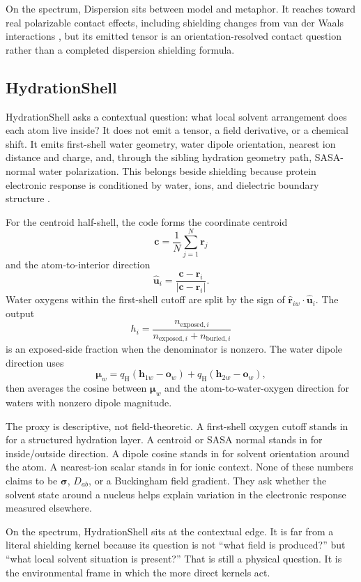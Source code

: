 \documentclass[11pt]{article}
\begin{document}
On the spectrum, Dispersion sits between model and metaphor. It reaches toward
real polarizable contact effects, including shielding changes from
van der Waals interactions \cite{kromhout1969}, but its emitted tensor is an
orientation-resolved contact question rather than a completed dispersion
shielding formula.

\subsection{HydrationShell}

HydrationShell asks a contextual question: what local solvent arrangement does
each atom live inside? It does not emit a tensor, a field derivative, or a
chemical shift. It emits first-shell water geometry, water dipole orientation,
nearest ion distance and charge, and, through the sibling hydration geometry
path, SASA-normal water polarization. This belongs beside shielding because
protein electronic response is conditioned by water, ions, and dielectric
boundary structure \cite{nakasako2004,halle2004,martin2015}.

For the centroid half-shell, the code forms the coordinate centroid
\[
  \bm c=\frac1N\sum_{j=1}^N\bm r_j
\]
and the atom-to-interior direction
\[
  \hat{\bm u}_i=\frac{\bm c-\bm r_i}{|\bm c-\bm r_i|}.
\]
Water oxygens within the first-shell cutoff are split by the sign of
\(\hat{\bm r}_{iw}\cdot\hat{\bm u}_i\). The output
\[
  h_i=
  \frac{n_{\mathrm{exposed},i}}
       {n_{\mathrm{exposed},i}+n_{\mathrm{buried},i}}
\]
is an exposed-side fraction when the denominator is nonzero. The water dipole
direction uses
\[
  \bm\mu_w
  =
  q_{\mathrm H}(\bm h_{1w}-\bm o_w)
  +
  q_{\mathrm H}(\bm h_{2w}-\bm o_w),
\]
then averages the cosine between \(\bm\mu_w\) and the atom-to-water-oxygen
direction for waters with nonzero dipole magnitude.

The proxy is descriptive, not field-theoretic. A first-shell oxygen cutoff
stands in for a structured hydration layer. A centroid or SASA normal stands in
for inside/outside direction. A dipole cosine stands in for solvent orientation
around the atom. A nearest-ion scalar stands in for ionic context. None of these
numbers claims to be \(\bm\sigma\), \(D_{ab}\), or a Buckingham field gradient.
They ask whether the solvent state around a nucleus helps explain variation in
the electronic response measured elsewhere.

On the spectrum, HydrationShell sits at the contextual edge. It is far from a
literal shielding kernel because its question is not ``what field is produced?''
but ``what local solvent situation is present?'' That is still a physical
question. It is the environmental frame in which the more direct kernels act.
\end{document}
